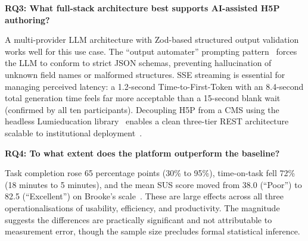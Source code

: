 \textbf{RQ3: What full-stack architecture best supports AI-assisted H5P authoring?}

A multi-provider LLM architecture with Zod-based structured output validation works well for this use case. The ``output automater'' prompting pattern~\cite{white2023} forces the LLM to conform to strict JSON schemas, preventing hallucination of unknown field names or malformed structures. SSE streaming is essential for managing perceived latency: a 1.2-second Time-to-First-Token with an 8.4-second total generation time feels far more acceptable than a 15-second blank wait (confirmed by all ten participants). Decoupling H5P from a CMS using the headless Lumieducation library~\cite{lumieducation2023} enables a clean three-tier REST architecture scalable to institutional deployment~\cite{bass2012}.

\textbf{RQ4: To what extent does the platform outperform the baseline?}

Task completion rose 65 percentage points (30\% to 95\%), time-on-task fell 72\% (18 minutes to 5 minutes), and the mean SUS score moved from 38.0 (``Poor'') to 82.5 (``Excellent'') on Brooke's scale~\cite{brooke1996}. These are large effects across all three operationalisations of usability, efficiency, and productivity. The magnitude suggests the differences are practically significant and not attributable to measurement error, though the sample size precludes formal statistical inference.
